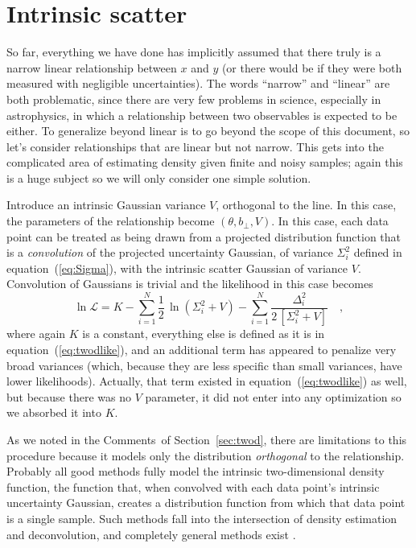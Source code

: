 \documentclass[12pt,twoside]{article}
\newcommand{\documentname}{document}
\newcommand{\sectionname}{Section}
\newcommand{\equationname}{equation}
\newcommand{\commentsname}{Comments}
\newcounter{problem}
\newcommand{\like}{\mathscr{L}}
\newcommand{\bperp}{b_{\perp}}
\begin{document}
\section{Intrinsic scatter}\label{sec:scatter}

So far, everything we have done has implicitly assumed that there
truly is a narrow linear relationship between $x$ and $y$ (or there
would be if they were both measured with negligible uncertainties).
The words ``narrow'' and ``linear'' are both problematic, since there
are very few problems in science, especially in astrophysics, in which
a relationship between two observables is expected to be either.  To
generalize beyond linear is to go beyond the scope of this
\documentname, so let's consider relationships that are linear but not
narrow.  This gets into the complicated area of estimating density
given finite and noisy samples; again this is a huge subject so we
will only consider one simple solution.

Introduce an intrinsic Gaussian variance $V$, orthogonal to the line.
In this case, the parameters of the relationship become
$(\theta,\bperp,V)$.  In this case, each data point can be treated as
being drawn from a projected distribution function that is a
\emph{convolution} of the projected uncertainty Gaussian, of variance
$\Sigma_i^2$ defined in \equationname~(\ref{eq:Sigma}), with the
intrinsic scatter Gaussian of variance $V$.  Convolution of Gaussians
is trivial and the likelihood in this case becomes
\begin{equation}
\ln\like = K - \sum_{i=1}^N \frac{1}{2}\,\ln(\Sigma_{i}^2+V)
 - \sum_{i=1}^N \frac{\Delta_i^2}{2\,[\Sigma_{i}^2+V]} \quad ,
\end{equation}
where again $K$ is a constant, everything else is defined as it is in
\equationname~(\ref{eq:twodlike}), and an additional term has
appeared to penalize very broad variances (which, because they are
less specific than small variances, have lower likelihoods).
Actually, that term existed in \equationname~(\ref{eq:twodlike}) as
well, but because there was no $V$ parameter, it did not enter into
any optimization so we absorbed it into $K$.

As we noted in the \commentsname\ of \sectionname~\ref{sec:twod},
there are limitations to this procedure because it models only the
distribution \emph{orthogonal} to the relationship.  Probably all good
methods fully model the intrinsic two-dimensional density function,
the function that, when convolved with each data point's intrinsic
uncertainty Gaussian, creates a distribution function from which that
data point is a single sample.  Such methods fall into the
intersection of density estimation and deconvolution, and completely
general methods exist \citep{bovy}.
\end{document}
